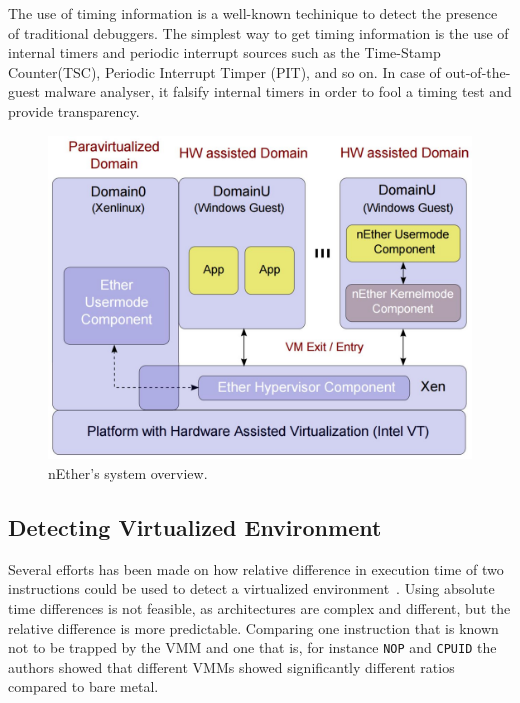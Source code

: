 The use of timing information is a well-known techinique to detect the presence of traditional debuggers. The simplest way to get timing information is the use of internal timers and periodic interrupt sources such as the Time-Stamp Counter(TSC), Periodic Interrupt Timper (PIT), and so on. In case of out-of-the-guest malware analyser, it falsify internal timers in order to fool a timing test and provide transparency.

\begin{figure}[!h]
	\centering
	\includegraphics[width=\linewidth]{figure/nether.png}
	\caption{nEther's system overview.}
	\label{fig:nether}
\end{figure}

\subsection{Detecting Virtualized Environment}


Several efforts has been made on how relative difference in execution time of
two instructions could be used to detect a virtualized
environment~\cite{raffetseder2007, thompson}. Using absolute time differences is
not feasible, as architectures are complex and different, but the relative
difference is more predictable. Comparing one instruction that is known not to
be trapped by the VMM and one that is, for instance {\tt NOP} and {\tt CPUID}
the authors showed that different VMMs showed significantly different ratios
compared to bare metal.

